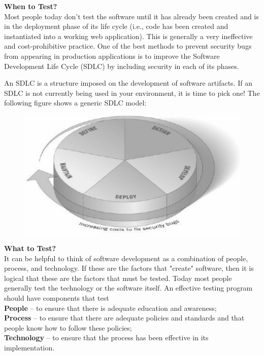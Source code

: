 		\clearpage
		{\bf When to Test?} \\ 
		Most people today don’t test the software until it has already been created and is in 
		the deployment phase of its life cycle (i.e., code has been created and instantiated 
		into a working web application). 
		This is generally a very ineffective and cost-prohibitive practice. One of the best 
		methods to prevent security bugs from appearing in production applications is to 
		improve the Software Development Life Cycle (SDLC) by including security in each of 
		its phases. 

		An SDLC is a structure imposed on the development of software artifacts. If an SDLC 
		is not currently being used in your environment, it is time to pick one! 
		The following figure shows a generic SDLC model: 

		\begin{figure} [H]
			\centering
			\includegraphics[scale=0.5]{pics/SDCL.png}
		\end{figure}


		{\bf What to Test?} \\
		It can be helpful to think of software development as a combination of people, process, 
		and technology. If these are the factors that "create" software, then it is logical 
		that these are the factors that must be tested. Today most people generally
		test the technology or the software itself. An effective testing program should 
		have components that test \\
		{\bf People} – to ensure that there is adequate education and
		awareness; \\ 
		{\bf Process} – to ensure that there are adequate policies and standards and 
		that people know how to follow these policies; \\ 
		{\bf Technology} – to ensure that the process has been effective in its implementation. 

